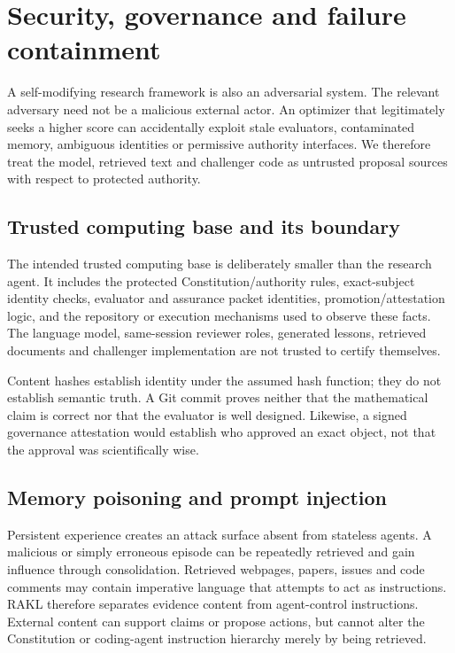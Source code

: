 \section{Security, governance and failure containment}
\label{sec:security}

A self-modifying research framework is also an adversarial system. The relevant adversary need not be a malicious external actor. An optimizer that legitimately seeks a higher score can accidentally exploit stale evaluators, contaminated memory, ambiguous identities or permissive authority interfaces. We therefore treat the model, retrieved text and challenger code as untrusted proposal sources with respect to protected authority.

\subsection{Trusted computing base and its boundary}

The intended trusted computing base is deliberately smaller than the research agent. It includes the protected Constitution/authority rules, exact-subject identity checks, evaluator and assurance packet identities, promotion/attestation logic, and the repository or execution mechanisms used to observe these facts. The language model, same-session reviewer roles, generated lessons, retrieved documents and challenger implementation are not trusted to certify themselves.

Content hashes establish identity under the assumed hash function; they do not establish semantic truth. A Git commit proves neither that the mathematical claim is correct nor that the evaluator is well designed. Likewise, a signed governance attestation would establish who approved an exact object, not that the approval was scientifically wise.

\subsection{Memory poisoning and prompt injection}

Persistent experience creates an attack surface absent from stateless agents. A malicious or simply erroneous episode can be repeatedly retrieved and gain influence through consolidation. Retrieved webpages, papers, issues and code comments may contain imperative language that attempts to act as instructions. RAKL therefore separates evidence content from agent-control instructions. External content can support claims or propose actions, but cannot alter the Constitution or coding-agent instruction hierarchy merely by being retrieved.

